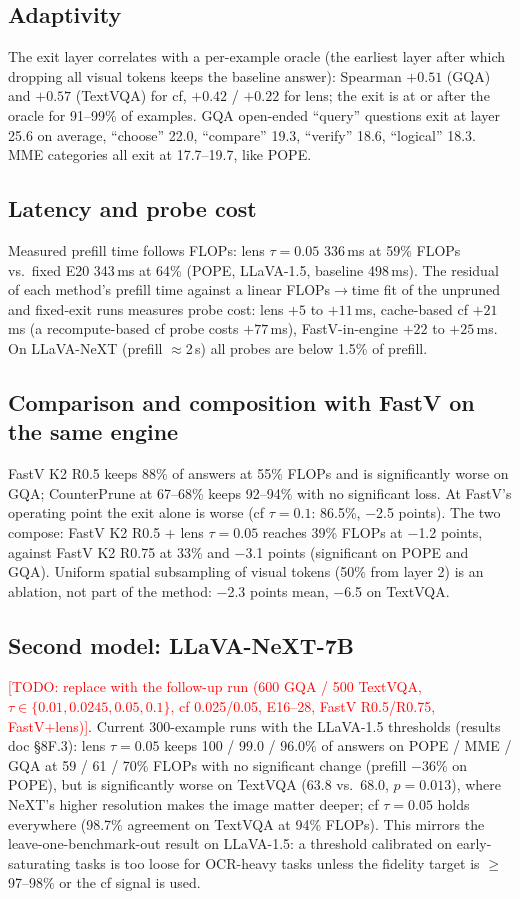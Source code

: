 \documentclass[10pt]{article}
\newcommand{\method}{CounterPrune}
\newcommand{\todo}[1]{\textcolor{red}{[TODO: #1]}}
\begin{document}
\subsection{Adaptivity}
The exit layer correlates with a per-example oracle (the earliest layer after which dropping all visual tokens keeps
the baseline answer): Spearman $+0.51$ (GQA) and $+0.57$ (TextVQA) for cf, $+0.42$ / $+0.22$ for lens; the exit is at or
after the oracle for 91--99\% of examples. GQA open-ended ``query'' questions exit at layer 25.6 on average, ``choose''
22.0, ``compare'' 19.3, ``verify'' 18.6, ``logical'' 18.3. MME categories all exit at 17.7--19.7, like POPE.

\subsection{Latency and probe cost}
Measured prefill time follows FLOPs: lens $\tau=0.05$ 336\,ms at 59\% FLOPs vs.\ fixed E20 343\,ms at 64\% (POPE,
LLaVA-1.5, baseline 498\,ms). The residual of each method's prefill time against a linear FLOPs$\to$time fit of the
unpruned and fixed-exit runs measures probe cost: lens $+5$ to $+11$\,ms, cache-based cf $+21$\,ms (a recompute-based
cf probe costs $+77$\,ms), FastV-in-engine $+22$ to $+25$\,ms. On LLaVA-NeXT (prefill $\approx$2\,s) all probes are
below 1.5\% of prefill.

\subsection{Comparison and composition with FastV on the same engine}
FastV K2 R0.5 keeps 88\% of answers at 55\% FLOPs and is significantly worse on GQA; \method{} at 67--68\% keeps
92--94\% with no significant loss. At FastV's operating point the exit alone is worse (cf $\tau=0.1$: 86.5\%,
$-$2.5 points). The two compose: FastV K2 R0.5 + lens $\tau=0.05$ reaches 39\% FLOPs at $-$1.2 points, against FastV K2
R0.75 at 33\% and $-$3.1 points (significant on POPE and GQA). Uniform spatial subsampling of visual tokens (50\% from
layer 2) is an ablation, not part of the method: $-$2.3 points mean, $-$6.5 on TextVQA.

\subsection{Second model: LLaVA-NeXT-7B}
\todo{replace with the follow-up run (600 GQA / 500 TextVQA, $\tau\in\{0.01,0.0245,0.05,0.1\}$, cf 0.025/0.05, E16--28,
FastV R0.5/R0.75, FastV+lens)}. Current 300-example runs with the LLaVA-1.5 thresholds (results doc \S8F.3): lens
$\tau=0.05$ keeps 100 / 99.0 / 96.0\% of answers on POPE / MME / GQA at 59 / 61 / 70\% FLOPs with no significant change
(prefill $-$36\% on POPE), but is significantly worse on TextVQA ($63.8$ vs.\ $68.0$, $p=0.013$), where NeXT's higher
resolution makes the image matter deeper; cf $\tau=0.05$ holds everywhere (98.7\% agreement on TextVQA at 94\% FLOPs).
This mirrors the leave-one-benchmark-out result on LLaVA-1.5: a threshold calibrated on early-saturating tasks is too
loose for OCR-heavy tasks unless the fidelity target is $\ge$97--98\% or the cf signal is used.
\end{document}
